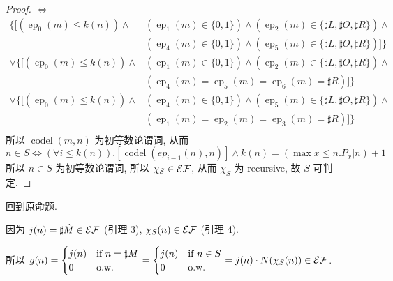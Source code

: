 \begin{solution}
\begin{proof}
$\Leftrightarrow$ \begin{align*}
\{[(\operatorname{ep}_0(m) \le k(n)) \land & (\operatorname{ep}_1(m) \in \{0,1\}) \land (\operatorname{ep}_2(m)\in\{\sharp L, \sharp O, \sharp R\}) \land \\ 
& (\operatorname{ep}_4(m) \in \{0,1\}) \land (\operatorname{ep}_5(m)\in\{\sharp L, \sharp O, \sharp R\})]\} \\
\lor \{[(\operatorname{ep}_0(m) \le k(n)) \land & (\operatorname{ep}_1(m) \in \{0,1\}) \land (\operatorname{ep}_2(m)\in\{\sharp L, \sharp O, \sharp R\}) \land \\ 
& (\operatorname{ep}_4(m) = \operatorname{ep}_5(m) = \operatorname{ep}_6(m) = \sharp R) ]\} \\
\lor \{[(\operatorname{ep}_0(m) \le k(n)) \land & (\operatorname{ep}_4(m) \in \{0,1\}) \land (\operatorname{ep}_5(m)\in\{\sharp L, \sharp O, \sharp R\}) \land \\ 
& (\operatorname{ep}_1(m) = \operatorname{ep}_2(m) = \operatorname{ep}_3(m) = \sharp R) ]\} \\
\end{align*}
所以 $\operatorname{codel}(m,n)$ 为初等数论谓词, 从而
\[
n \in S \Leftrightarrow (\forall i \le k(n)). [\operatorname{codel}(ep_{i-1}(n), n)] \land k(n) = (\max x\le n. P_x | n) + 1
\]
所以 $n \in S$ 为初等数论谓词, 所以 $\chi_S \in \mathcal{EF}$, 从而 $\chi_S$ 为 recursive, 故 $S$ 可判定.
\end{proof}

回到原命题.

因为 $j(n) = \sharp \hat{M} \in \mathcal{EF}$ (引理 3), $\chi_S(n) \in \mathcal{EF}$ (引理 4).

所以 $g(n) = \begin{cases}j(n) & \text{if } n = \sharp M \\ 0 & \text{o.w.}\end{cases} = \begin{cases}j(n) & \text{if } n \in S \\ 0 & \text{o.w.}\end{cases} = j(n) \cdot N(\chi_S(n)) \in \mathcal{EF}$.

\end{solution}
